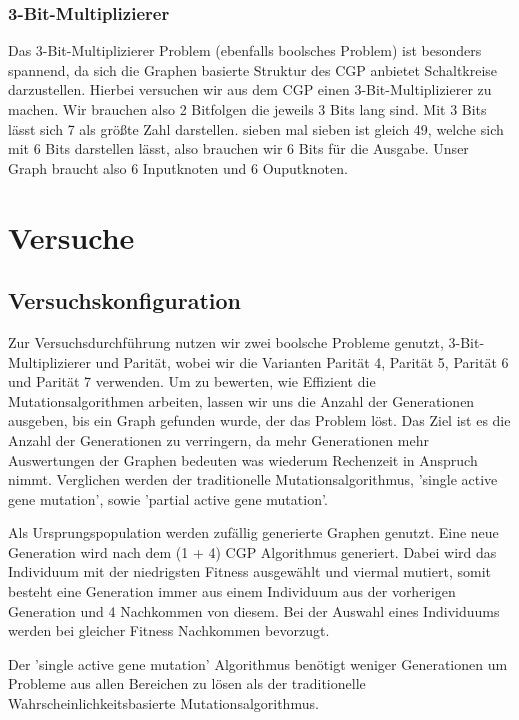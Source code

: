 \subsection{3-Bit-Multiplizierer}

Das 3-Bit-Multiplizierer Problem (ebenfalls boolsches Problem) ist besonders spannend, da sich die Graphen basierte Struktur des CGP anbietet Schaltkreise darzustellen. Hierbei versuchen wir aus dem CGP einen 3-Bit-Multiplizierer zu machen. Wir brauchen also 2 Bitfolgen die jeweils 3 Bits lang sind. Mit 3 Bits lässt sich 7 als größte Zahl darstellen. sieben mal sieben ist gleich 49, welche sich mit 6 Bits darstellen lässt, also brauchen wir 6 Bits für die Ausgabe. Unser Graph braucht also 6 Inputknoten und 6 Ouputknoten.

\chapter{Versuche}


\section{Versuchskonfiguration}

Zur Versuchsdurchführung nutzen wir zwei boolsche Probleme genutzt, 3-Bit-Multiplizierer und Parität, wobei wir die Varianten Parität 4, Parität 5, Parität 6 und Parität 7 verwenden. Um zu bewerten, wie Effizient die Mutationsalgorithmen arbeiten, lassen wir uns die Anzahl der Generationen ausgeben, bis ein Graph gefunden wurde, der das Problem löst. Das Ziel ist es die Anzahl der Generationen zu verringern, da mehr Generationen mehr Auswertungen der Graphen bedeuten was wiederum Rechenzeit in Anspruch nimmt. Verglichen werden der traditionelle Mutationsalgorithmus, 'single active gene mutation', sowie 'partial active gene mutation'.

Als Ursprungspopulation werden zufällig generierte Graphen genutzt. Eine neue Generation wird nach dem (1 + 4) CGP Algorithmus generiert. Dabei wird das Individuum mit der niedrigsten Fitness ausgewählt und viermal mutiert, somit besteht eine Generation immer aus einem Individuum aus der vorherigen Generation und 4 Nachkommen von diesem. Bei der Auswahl eines Individuums werden bei gleicher Fitness Nachkommen bevorzugt.

\begin{hypothesis}
Der 'single active gene mutation' Algorithmus benötigt weniger Generationen um Probleme aus allen Bereichen zu lösen als der traditionelle Wahrscheinlichkeitsbasierte Mutationsalgorithmus.
\end{hypothesis}

